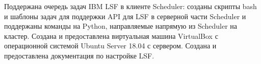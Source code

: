 
Поддержана очередь задач IBM LSF в клиенте Scheduler: созданы скрипты bash и шаблоны задач для поддержки API для LSF в серверной части Scheduler и поддержаны команды на Python, направляемые напрямую из Scheduler на кластер. Создана и предоставлена виртуальная машина VirtualBox с операционной системой Ubuntu Server 18.04 с сервером. Создана и предоставлена документация по настройке LSF.

\clearpage
